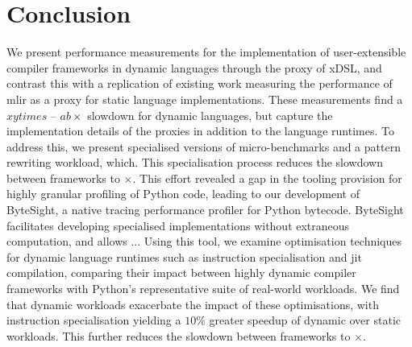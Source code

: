 

\chapter{Conclusion}
\label{chap:conclusion}



We present performance measurements for the implementation of user-extensible compiler frameworks in dynamic languages through the proxy of xDSL, and contrast this with a replication of existing work measuring the performance of \ac{mlir} as a proxy for static language implementations. These measurements find a $xytimes$ -- $ab\times$ slowdown for dynamic languages, but capture the implementation details of the proxies in addition to the language runtimes. %
To address this, we present specialised versions of micro-benchmarks and a pattern rewriting workload, which. This specialisation process reduces the slowdown between frameworks to $\times$.
This effort revealed a gap in the tooling provision for highly granular profiling of Python code, leading to our development of ByteSight, a native tracing performance profiler for Python bytecode. ByteSight facilitates developing specialised implementations without extraneous computation, and allows ...
Using this tool, we examine optimisation techniques for dynamic language runtimes such as instruction specialisation and \ac{jit} compilation, comparing their impact between highly dynamic compiler frameworks with Python's representative suite of real-world workloads. We find that dynamic workloads exacerbate the impact of these optimisations, with instruction specialisation yielding a $10\%$ greater speedup of dynamic over static workloads. This further reduces the slowdown between frameworks to $\times$.


